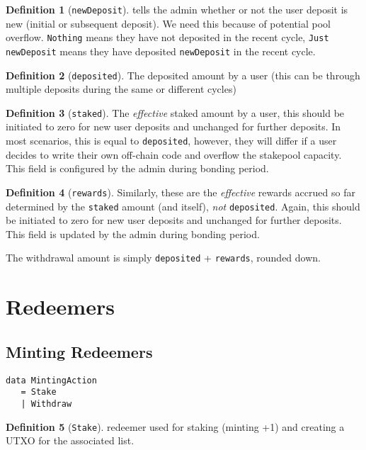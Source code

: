 \documentclass[10pt, a4paper]{article}
\theoremstyle{definition}
\newtheorem{definition}{Definition}[section]
\begin{document}
\begin{definition}[\texttt{newDeposit}]\label{def:newDeposit} tells the admin whether or not the user deposit is new (initial or subsequent deposit). We need this because of potential pool overflow. \texttt{Nothing} means they have not deposited in the recent cycle, \texttt{Just newDeposit} means they have deposited \texttt{newDeposit} in the recent cycle.
\end{definition}

\begin{definition}[\texttt{deposited}]\label{def:deposited}
The deposited amount by a user (this can be through multiple deposits during the same or different cycles)
\end{definition}

\begin{definition}[\texttt{staked}]\label{def:staked}
The \textit{effective} staked amount by a user, this should be initiated to zero for new user deposits and unchanged for further deposits. In most scenarios, this is equal to \texttt{deposited}, however, they will differ if a user decides to write their own off-chain code and overflow the stakepool capacity. This field is configured by the admin during bonding period.
\end{definition}

\begin{definition}[\texttt{rewards}]\label{def:rewards}
Similarly, these are the \textit{effective} rewards accrued so far determined by the \texttt{staked} amount (and itself), \textit{not}
 \texttt{deposited}. Again, this should be initiated to zero for new user deposits and unchanged for further deposits. This field is updated by the admin during bonding period.
\end{definition}

The withdrawal amount is simply \texttt{deposited} + \texttt{rewards}, rounded down.

\section{Redeemers}
\subsection{Minting Redeemers}
\begin{verbatim}
data MintingAction
   = Stake
   | Withdraw
\end{verbatim}
\begin{definition}[\texttt{Stake}]\label{def:Stake} redeemer used for staking (minting +1) and creating a UTXO for the associated list.
\end{definition}
\end{document}
